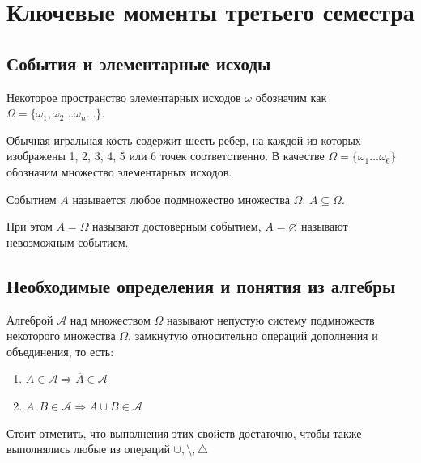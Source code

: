 \section{Ключевые моменты третьего семестра}

\subsection{События и элементарные исходы}

\begin{definition}
    Некоторое пространство элементарных исходов $\omega$ обозначим
    как $\Omega = \{ \omega_1, \omega_2 \dots \omega_n \dots\}$.
\end{definition}

\begin{example}
    Обычная игральная кость содержит шесть ребер, на каждой из которых 
    изображены 1, 2, 3, 4, 5 или 6 точек соответственно. В качестве 
    $\Omega = \{\omega_1 \dots \omega_6\}$ обозначим множество элементарных исходов.
\end{example}

\begin{definition}
    Событием $A$ называется любое подмножество множества $\Omega$: 
    $A \subseteq \Omega$. 

    При этом $A = \Omega$ называют достоверным событием, $A = \varnothing $ называют
    невозможным событием.
\end{definition}

\subsection{Необходимые определения и понятия из алгебры}

\begin{definition}
    Алгеброй $\mathcal{A}$ над множеством $\Omega$ называют непустую систему подмножеств некоторого множества $\Omega$, 
    замкнутую относительно операций дополнения и объединения, то есть:
    \begin{enumerate}
        \item $A \in \mathcal{A} \Rightarrow \overline{A} \in \mathcal{A}$
        \item $A, B \in \mathcal{A} \Rightarrow A \cup B \in \mathcal{A}$
    \end{enumerate}
    Стоит отметить, что выполнения этих свойств достаточно, чтобы также 
    выполнялись любые из операций $\cup, \setminus , \triangle$
\end{definition}

